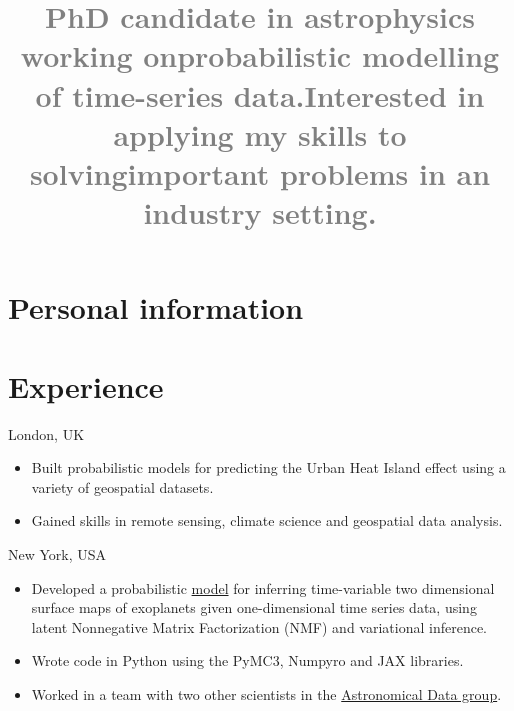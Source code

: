 \documentclass[11pt,a4paper,roman, colorlinks,linkcolor=true]{moderncv}
\title{\textcolor{gray}{ \normalsize PhD candidate in astrophysics 
working on\newline probabilistic modelling of time-series data.\newline Interested 
in applying my skills to solving\newline important problems in an industry setting.}}
\begin{document}
\renewcommand*{\titlefont}{\fontsize{10}{14}\mdseries\upshape}
\renewcommand*{\namefont}{\fontsize{32}{34}\mdseries\upshape}
\patchcmd{\section}{0.95ex}{0.5ex}{}{}
\makecvtitle

\section{Personal information}

\hypersetup{urlcolor=links}
\section{Experience}
{London, UK}{}{
    \begin{itemize}
        \item Built probabilistic models for predicting the Urban Heat Island effect using a variety of geospatial datasets.
        \item Gained skills in remote sensing, climate science and geospatial data analysis.
    \end{itemize}}
{New York, USA}{}{
    \begin{itemize}
        \item Developed a probabilistic \href{https://speakerdeck.com/fbartolic/inferring-a-time-dependent-map-of-io-from-occultations-and-phase-curves}{model} for inferring time-variable two dimensional surface maps of exoplanets given one-dimensional time series data, using latent Nonnegative Matrix Factorization (NMF) and variational inference.
        \item Wrote code in \textsf{Python} using the \textsf{PyMC3}, \textsf{Numpyro} and \textsf{JAX} libraries.
        \item Worked in a team with two other scientists in the \href{https://www.simonsfoundation.org/flatiron/center-for-computational-astrophysics/astronomical-data/}{Astronomical Data group}.
\end{itemize}}
\end{document}
